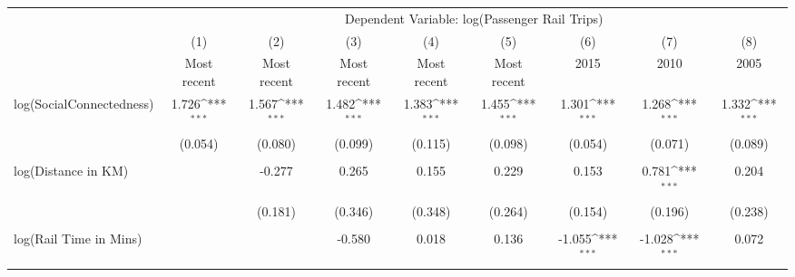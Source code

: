 {
\def\sym#1{\ifmmode^{#1}\else\(^{#1}\)\fi}
\begin{tabular}{l*{8}{c}}
\hline\hline
            &\multicolumn{8}{c}{Dependent Variable: log(Passenger Rail Trips)}         &                     &                     &                     &                     &                     &                     &                     \\
            &\multicolumn{1}{c}{(1)}         &\multicolumn{1}{c}{(2)}         &\multicolumn{1}{c}{(3)}         &\multicolumn{1}{c}{(4)}         &\multicolumn{1}{c}{(5)}         &\multicolumn{1}{c}{(6)}         &\multicolumn{1}{c}{(7)}         &\multicolumn{1}{c}{(8)}         \\
            & Most recent         & Most recent         & Most recent         & Most recent         & Most recent         &        2015         &        2010         &        2005         \\
\hline
log(SocialConnectedness)&       1.726\sym{***}&       1.567\sym{***}&       1.482\sym{***}&       1.383\sym{***}&       1.455\sym{***}&       1.301\sym{***}&       1.268\sym{***}&       1.332\sym{***}\\
            &     (0.054)         &     (0.080)         &     (0.099)         &     (0.115)         &     (0.098)         &     (0.054)         &     (0.071)         &     (0.089)         \\
            &                     &                     &                     &                     &                     &                     &                     &                     \\
log(Distance in KM)&                     &      -0.277         &       0.265         &       0.155         &       0.229         &       0.153         &       0.781\sym{***}&       0.204         \\
            &                     &     (0.181)         &     (0.346)         &     (0.348)         &     (0.264)         &     (0.154)         &     (0.196)         &     (0.238)         \\
            &                     &                     &                     &                     &                     &                     &                     &                     \\
log(Rail Time in Mins)&                     &                     &      -0.580         &       0.018         &       0.136         &      -1.055\sym{***}&      -1.028\sym{***}&       0.072         \\

\end{tabular}}
